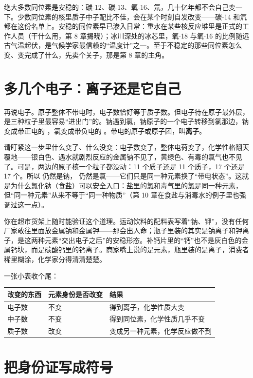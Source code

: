 绝大多数同位素是安稳的：碳-12、碳-13、氧-16、氘，几十亿年都不会自己变一下。少数同位素的核里质子中子配比不佳，会在某个时刻自发改变——碳-14 和氚都在这份名单上。安稳的同位素早已渗入日常：重水在某些核反应堆里是正式的工作人员（干什么用，第 8 章揭晓）；冰川深处的冰芯里，氧-18 与氧-16 的比例随远古气温起伏，是气候学家最信赖的“温度计”之一。至于不稳定的那些同位素怎么变、变完成了什么，先卖个关子，那是第 8 章的主角。

\section{多几个电子：离子还是它自己}

再说电子。原子整体不带电时，电子数恰好等于质子数。但电子待在原子最外层，是三种粒子里最容易“进出门”的。钠遇到氯，钠原子的一个电子转移到氯那边，钠变成带正电的 ，氯变成带负电的 。带电的原子或原子团，叫\textbf{离子}。

请盯紧这一步里什么变了、什么没变：电子数变了，整体电荷变了，化学性格翻天覆地——银白色、遇水就剧烈反应的金属钠不见了，黄绿色、有毒的氯气也不见了。可是，两边的原子核一个粒子都没动：11 个质子还是 11 个质子，17 个还是 17 个。所以  仍然是钠， 仍然是氯——它们只是同一种元素换了“带电状态”。这就是为什么氯化钠（食盐）可以安全入口：盐里的氯和毒气里的氯是同一种元素，但“同一种元素”从来不等于“同一种物质”（第 10 章在食盐与消毒水的例子里也强调过这一点）。

你在超市货架上随时能验证这个道理。运动饮料的配料表写着“钠、钾”，没有任何厂家敢往里面放金属钠和金属钾——那会出人命；瓶子里装的其实是钠离子和钾离子，是这两种元素“交出电子之后”的安稳形态。补钙片里的“钙”也不是灰白色的金属钙块，而是碳酸钙里的钙离子。商家嘴上说的是元素，瓶里装的是离子，消费者稀里糊涂，化学家分得清清楚楚。

一张小表收个尾：

\begin{table}[htbp]
\centering
\begin{tabular}{lll}
\toprule
改变的东西 & 元素身份是否改变 & 结果 \\
\midrule
电子数 & 不变 & 得到离子，化学性质大变 \\
中子数 & 不变 & 得到同位素，化学性质几乎不变 \\
质子数 & 改变 & 变成另一种元素，化学反应做不到 \\
\bottomrule
\end{tabular}
\end{table}

\section{把身份证写成符号}

